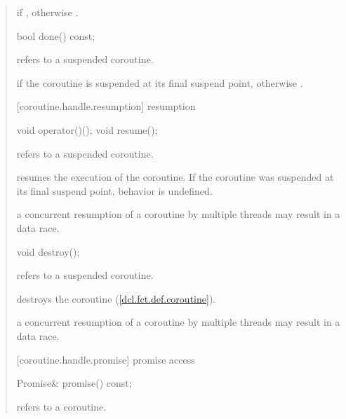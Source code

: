 \begin{quote}
\begin{itemdescr}
  \pnum
  \returns {} if , otherwise .
\end{itemdescr}

\begin{itemdecl}
  bool done() const; 
\end{itemdecl}
\begin{itemdescr}
  \pnum
  \precondition {} refers to a suspended coroutine.
	
  \pnum
  \returns {} if the coroutine is suspended
    at its final suspend point, otherwise .
\end{itemdescr}

[coroutine.handle.resumption]{ resumption}
\begin{itemdecl}
  void operator()();
  void resume();	
\end{itemdecl}
\begin{itemdescr}
  \pnum
  \precondition {} refers to a suspended coroutine.
  
  \pnum
  \effects resumes the execution of the coroutine. If the coroutine was suspended
  at its final suspend point, behavior is undefined.
  
  \pnum
  \sync a concurrent resumption of a coroutine by multiple threads may result in a data race.
  
\end{itemdescr}

\begin{itemdecl}
  void destroy();
\end{itemdecl}
\begin{itemdescr}
  \pnum
  \precondition {} refers to a suspended coroutine.
  
  \pnum
  \effects destroys the coroutine (\ref{dcl.fct.def.coroutine}).
  
\pnum
\sync a concurrent resumption of a coroutine by multiple threads may result in a data race.
\end{itemdescr}

[coroutine.handle.promise]{ promise access}
\begin{itemdecl}
  Promise& promise() const;		
\end{itemdecl}

\begin{itemdescr}
  \pnum
  \precondition {} refers to a coroutine.
  

\end{itemdescr}
\end{quote}

